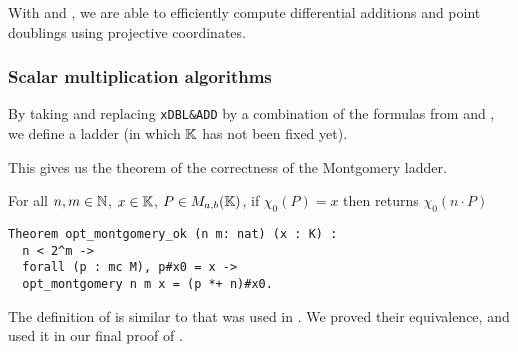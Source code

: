 With  and , we are able to efficiently compute
differential additions and point doublings using projective coordinates.

\subsubsection{Scalar multiplication algorithms}
\label{subsec:ECC-ladder}

By taking  and replacing \texttt{xDBL\&ADD} by a
combination of the formulas from  and , %
we define a ladder  (in which $\mathbb{K}$ has not been fixed yet).

%

This gives us the theorem of the correctness of the Montgomery ladder.
\begin{theorem}
  \label{thm:montgomery-ladder-correct}
  For all $n, m \in \mathbb{N}$, $x \in \mathbb{K}$, $P \in M_{a,b}(\mathbb{K})$,
  if $\chi_0(P) = x$ then  returns $\chi_0(n \cdot P)$
\end{theorem}
\begin{lstlisting}[language=Coq]
Theorem opt_montgomery_ok (n m: nat) (x : K) :
  n < 2^m ->
  forall (p : mc M), p#x0 = x ->
  opt_montgomery n m x = (p *+ n)#x0.
\end{lstlisting}
The definition of  is similar to 
that was used in .
We proved their equivalence, and used it in our
final proof of .


